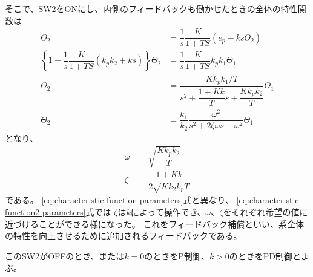 \documentclass[../../../main]{subfiles}
\begin{document}
そこで、SW2をONにし、内側のフィードバックも働かせたときの全体の特性関数は
\begin{align}\label{eq:characteristic-function2}
	\Theta_2                                                                       & = \dfrac{1}{s} \dfrac{K}{1+TS} \left(e_p - ks\Theta_2\right) \nonumber                     \\
	\left\{ 1 + \dfrac{1}{s}\dfrac{K}{1+TS}\left(k_pk_2+ks\right) \right\}\Theta_2 & = \dfrac{1}{s} \dfrac{K}{1+TS} k_p k_1 \Theta_1 \nonumber                                  \\
	\Theta_2                                                                       & = \dfrac{K k_p k_1 / T}{s^2 + \dfrac{1 + Kk}{T}s + \dfrac{Kk_p k_2}{T}} \Theta_1 \nonumber \\
	\Theta_2                                                                       & = \dfrac{k_1}{k_2} \dfrac{\omega^2}{s^2 + 2\zeta\omega s + \omega^2} \Theta_1
\end{align}
となり、
\begin{equation}\label{eq:characteristic-function2-parameters}
	\begin{split}
		\omega & = \sqrt{\dfrac{K k_p k_2}{T}}    \\
		\zeta  & = \dfrac{1+Kk}{2\sqrt{Kk_2k_pT}}
	\end{split}
\end{equation}
である。
\ref{eq:characteristic-function-parameters}式と異なり、
\ref{eq:characteristic-function2-parameters}式では
$\zeta$は$k$によって操作でき、$\omega$、$\zeta$をそれぞれ希望の値に近づけることができる様になった。
これをフィードバック補償といい、系全体の特性を向上させるために追加されるフィードバックである。

このSW2がOFFのとき、または$k=0$のときをP制御、$k>0$のときをPD制御とよぶ。
\end{document}

